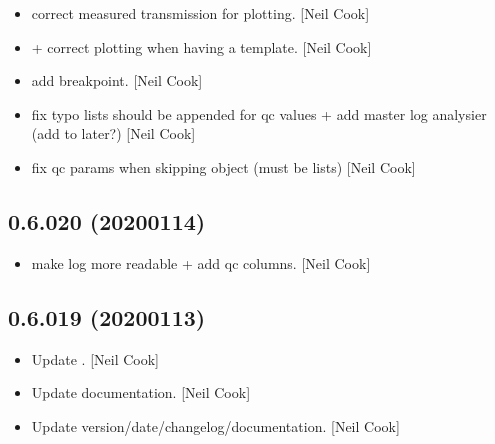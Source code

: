 \documentclass[a4paper,10pt,english]{report}
\begin{document}
\begin{itemize}
\item {} 
 \sphinxhyphen{} correct measured transmission for
plotting. {[}Neil Cook{]}

\item {} 
 +  \sphinxhyphen{} correct
plotting when having a template. {[}Neil Cook{]}

\item {} 
 \sphinxhyphen{} add breakpoint. {[}Neil Cook{]}

\item {} 
 \sphinxhyphen{} fix typo lists should be appended for qc values
+ add master log analysier (add to  later?) {[}Neil Cook{]}

\item {} 
 \sphinxhyphen{} fix qc params when skipping
object (must be lists) {[}Neil Cook{]}

\end{itemize}


\subsection{0.6.020 (2020\sphinxhyphen{}01\sphinxhyphen{}14)}
\label{\detokenize{misc/changelog:id17}}\begin{itemize}
\item {} 
 \sphinxhyphen{} make log more readable + add qc  columns. {[}Neil
Cook{]}

\end{itemize}


\subsection{0.6.019 (2020\sphinxhyphen{}01\sphinxhyphen{}13)}
\label{\detokenize{misc/changelog:id18}}\begin{itemize}
\item {} 
Update . {[}Neil Cook{]}

\item {} 
Update documentation. {[}Neil Cook{]}

\item {} 
Update version/date/changelog/documentation. {[}Neil Cook{]}

\end{itemize}
\end{document}
